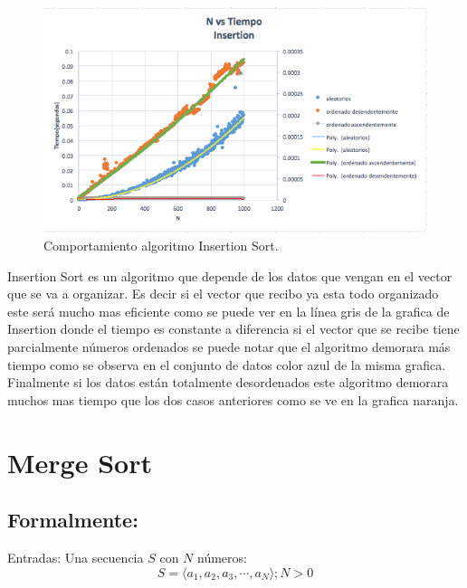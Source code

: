 \documentclass[12pt,spanish]{article}
\theoremstyle{definition}
\begin{document}
\begin{figure}[htb]
\centering
\includegraphics[scale=0.6]{I}
\caption{Comportamiento algoritmo Insertion Sort.}
\end{figure}

Insertion Sort es un algoritmo que depende de los datos que vengan en el vector que se va a organizar. Es decir si el vector que recibo ya esta todo organizado este será mucho mas eficiente como se puede ver en la línea gris de la grafica de Insertion donde el tiempo es constante a diferencia si el vector que se recibe tiene parcialmente números ordenados se puede notar que el algoritmo demorara más tiempo como se observa en el conjunto de datos color azul de la misma grafica. Finalmente si los datos están totalmente desordenados este algoritmo demorara muchos mas tiempo que los dos casos anteriores como se ve en la grafica naranja. 

\section{Merge Sort}{}

\subsection{Formalmente:}{}
Entradas: Una secuencia $S$ con $N$ números:
\begin{equation}
    S =  \left.\langle a_{1}, a_{2}, a_{3}, \cdots, a_{N} \rangle\right.;
    N > 0
\end{equation}
\end{document}
